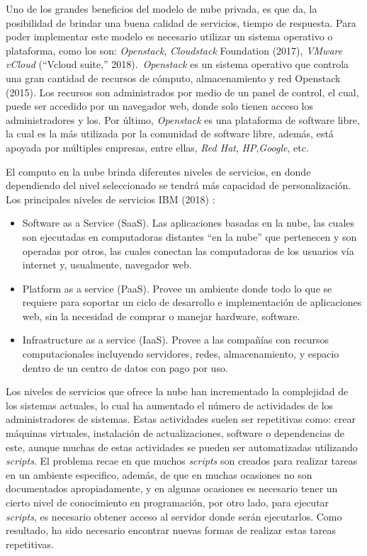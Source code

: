 \documentclass[12pt,twoside]{reedthesis}
\begin{document}
Uno de los grandes beneficios del modelo de nube privada, es que da, la posibilidad de brindar una buena calidad de servicios, tiempo de respuesta. Para poder implementar este modelo es necesario utilizar un sistema operativo o plataforma, como los son: \emph{Openstack}, \emph{Cloudstack} Foundation (2017), \emph{VMware vCloud} (``Vcloud suite,'' 2018).~\emph{Openstack} es un sistema operativo que controla una gran cantidad de recursos de cómputo, almacenamiento y red Openstack (2015). Los recursos son administrados por medio de un panel de control, el cual, puede ser accedido por un navegador web, donde solo tienen acceso los administradores y los. Por último, \emph{Openstack} es una plataforma de software libre, la cual es la más utilizada por la comunidad de software libre, además, está apoyada por múltiples empresas, entre ellas, \emph{Red Hat}, \emph{HP},\emph{Google}, etc.~

El computo en la nube brinda diferentes niveles de servicios, en donde dependiendo del nivel seleccionado se tendrá más capacidad de personalización. Los principales niveles de servicios IBM (2018) :
\begin{itemize}
\item
  Software as a Service (SaaS). Las aplicaciones basadas en la nube, las cuales son ejecutadas en computadoras distantes ``en la nube'' que pertenecen y son operadas por otros, las cuales conectan las computadoras de los usuarios vía internet y, usualmente, navegador web.
\item
  Platform as a service (PaaS). Provee un ambiente donde todo lo que se requiere para soportar un ciclo de desarrollo e implementación de aplicaciones web, sin la necesidad de comprar o manejar hardware, software.
\item
  Infrastructure as a service (IaaS). Provee a las compañías con recursos computacionales incluyendo servidores, redes, almacenamiento, y espacio dentro de un centro de datos con pago por uso.
\end{itemize}
Los niveles de servicios que ofrece la nube han incrementado la complejidad de los sistemas actuales, lo cual ha aumentado el número de actividades de los administradores de sistemas. Estas actividades suelen ser repetitivas como: crear máquinas virtuales, instalación de actualizaciones, software o dependencias de este, aunque muchas de estas actividades se pueden ser automatizadas utilizando \emph{scripts}. El problema recae en que muchos \emph{scripts} son creados para realizar tareas en un ambiente especifico, además, de que en muchas ocasiones no son documentados apropiadamente, y en algunas ocasiones es necesario tener un cierto nivel de conocimiento en programación, por otro lado, para ejecutar \emph{scripts}, es necesario obtener acceso al servidor donde serán ejecutarlos. Como resultado, ha sido necesario encontrar nuevas formas de realizar estas tareas repetitivas.
\end{document}

